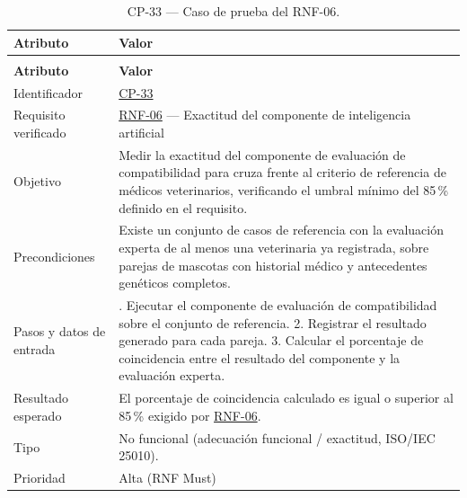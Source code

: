 \documentclass[journal,onecolumn]{IEEEtran}
\makeatletter
\newenvironment{atributos}[2]{%
	\small
	\begin{longtable}{@{}>{\raggedright\arraybackslash}p{4.2cm} >{\raggedright\arraybackslash}p{11.2cm}@{}}
		\caption{#2}\label{tab:#1}\\
		\toprule
		\textbf{Atributo} & \textbf{Valor} \\
		\midrule
		\endfirsthead
		\multicolumn{2}{@{}l}{\small\itshape (continuación)}\\
		\toprule
		\textbf{Atributo} & \textbf{Valor} \\
		\midrule
		\endhead
		\bottomrule
		\endlastfoot
	}{%
	\end{longtable}
	\normalsize
}
\makeatother
\begin{document}
	\begin{atributos}{CP-33}{CP-33 --- Caso de prueba del RNF-06.}
		Identificador & \hyperref[tab:CP-33]{CP-33} \\
		Requisito verificado & \hyperref[tab:RNF-06]{RNF-06} --- Exactitud del componente de inteligencia artificial \\
		Objetivo & Medir la exactitud del componente de evaluación de compatibilidad para cruza frente al criterio de referencia de médicos veterinarios, verificando el umbral mínimo del 85\,\% definido en el requisito. \\
		Precondiciones & Existe un conjunto de casos de referencia con la evaluación experta de al menos una veterinaria ya registrada, sobre parejas de mascotas con historial médico y antecedentes genéticos completos. \\
		Pasos y datos de entrada & 1. Ejecutar el componente de evaluación de compatibilidad sobre el conjunto de referencia. 2. Registrar el resultado generado para cada pareja. 3. Calcular el porcentaje de coincidencia entre el resultado del componente y la evaluación experta. \\
		Resultado esperado & El porcentaje de coincidencia calculado es igual o superior al 85\,\% exigido por \hyperref[tab:RNF-06]{RNF-06}. \\
		Tipo & No funcional (adecuación funcional / exactitud, ISO/IEC 25010). \\
		Prioridad & Alta (RNF Must) \\
	\end{atributos}
\end{document}
